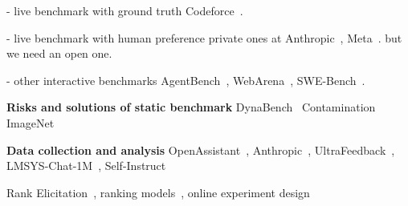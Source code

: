 - live benchmark  with ground truth
Codeforce~\cite{huang2023competition,li2022competition}.

- live benchmark with human preference
private ones at Anthropic~\cite{bai2022training}, Meta~\cite{touvron2023llama2}.
but we need an open one.

- other interactive benchmarks
AgentBench~\cite{liu2023agentbench}, WebArena~\cite{zhou2023webarena}, SWE-Bench~\cite{jimenez2024swebench}.

\textbf{Risks and solutions of static benchmark}
DynaBench~\cite{kiela2021dynabench}
Contamination~\cite{yang2023rethinking,oren2023proving,deng2023investigating}
ImageNet~\cite{recht2019imagenet}

\textbf{Data collection and analysis}
OpenAssistant~\cite{kopf2023openassistant}, Anthropic~\cite{bai2022training}, UltraFeedback~\cite{cui2023ultrafeedback},
LMSYS-Chat-1M~\cite{zheng2023lmsyschat1m},
Self-Instruct~\cite{wang-etal-2023-self-instruct}

Rank Elicitation~\cite{online_rank,pmlr-v32-busa-fekete14,preference_rank_elicitation},
ranking models~\cite{mm_bradley_terry,tie_in_bradley_terry},
online experiment design~\cite{sequential_design, karimi2021online}

\fi